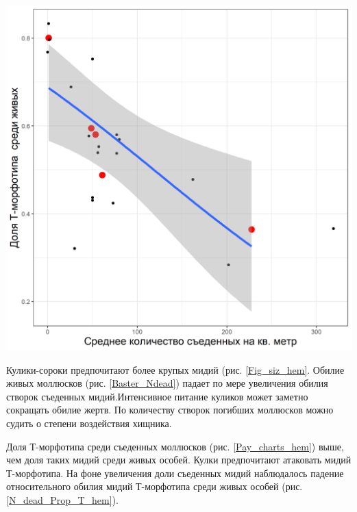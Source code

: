 \documentclass[a0,portrait]{a0poster}
\begin{document}
\begin{multicols}{2}
\begin{minipage}[t]{0.46\linewidth}
\begin{center}
			\includegraphics[width=0.9\linewidth]{N_dead_Prop_T_hem.png}
			\label{N_dead_Prop_T_hem}
		\end{center}
\end{minipage}\vspace{0.5cm}



Кулики-сороки предпочитают более крупых мидий (рис. \ref{Fig_siz_hem}. 
Обилие живых моллюсков (рис. \ref{Baster_Ndead}) падает по мере увеличения обилия створок съеденных мидий.Интенсивное питание куликов может заметно сокращать обилие жертв. По количеству створок погибших моллюсков можно судить о степени воздействия хищника.

Доля Т-морфотипа среди съеденных моллюсков (рис.  \ref{Pay_charts_hem}) выше, чем доля таких мидий среди живых особей. Кулки предпочитают атаковать мидий Т-морфотипа. 
На фоне увеличения доли съеденных мидий наблюдалось падение относительного обилия мидий Т-морфотипа среди живых особей (рис. \ref{N_dead_Prop_T_hem}).




		

\end{multicols}
\end{document}
